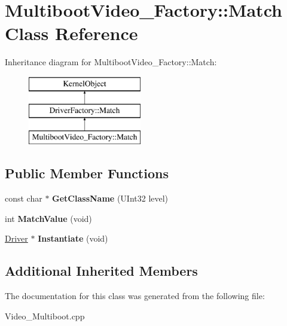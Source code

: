 \hypertarget{class_multiboot_video___factory_1_1_match}{}\section{Multiboot\+Video\+\_\+\+Factory\+:\+:Match Class Reference}
\label{class_multiboot_video___factory_1_1_match}
Inheritance diagram for Multiboot\+Video\+\_\+\+Factory\+:\+:Match\+:\begin{figure}[H]
\begin{center}
\leavevmode
\includegraphics[height=3.000000cm]{class_multiboot_video___factory_1_1_match}
\end{center}
\end{figure}
\subsection*{Public Member Functions}
\begin{DoxyCompactItemize}
\item 
\mbox{\label{class_multiboot_video___factory_1_1_match_a570369e2b918334a2de17316316b941b}} 
const char $\ast$ {\bfseries Get\+Class\+Name} (U\+Int32 level)
\item 
\mbox{\label{class_multiboot_video___factory_1_1_match_aecb13bfaf1897d83cbd0cccd9b0d0eb6}} 
int {\bfseries Match\+Value} (void)
\item 
\mbox{\label{class_multiboot_video___factory_1_1_match_a2f62b415e8bcab1c9b624936ccbaa4cb}} 
\hyperlink{class_driver}{Driver} $\ast$ {\bfseries Instantiate} (void)
\end{DoxyCompactItemize}
\subsection*{Additional Inherited Members}


The documentation for this class was generated from the following file\+:\begin{DoxyCompactItemize}
\item 
Video\+\_\+\+Multiboot.\+cpp\end{DoxyCompactItemize}
